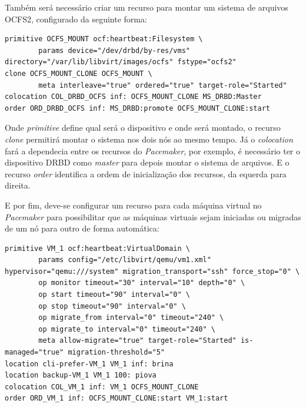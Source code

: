 Também será necessário criar um recurso para montar um sistema de arquivos \ac{OCFS2}, configurado da seguinte forma:
\begin{lstlisting}
primitive OCFS_MOUNT ocf:heartbeat:Filesystem \
        params device="/dev/drbd/by-res/vms" directory="/var/lib/libvirt/images/ocfs" fstype="ocfs2"
clone OCFS_MOUNT_CLONE OCFS_MOUNT \
        meta interleave="true" ordered="true" target-role="Started"
colocation COL_DRBD_OCFS inf: OCFS_MOUNT_CLONE MS_DRBD:Master
order ORD_DRBD_OCFS inf: MS_DRBD:promote OCFS_MOUNT_CLONE:start
\end{lstlisting}
Onde \textit{primitive} define qual será o dispositivo e onde será montado, o recurso \textit{clone} permitirá montar o sistema nos dois nós
ao mesmo tempo. Já o \textit{colocation} fará a dependecia entre os recursos do \textit{Pacemaker}, por exemplo, é necessário ter o dispositivo 
\ac{DRBD} como \textit{master} para depois montar o sistema de arquivos. E o recurso \textit{order} identifica a ordem de inicialização dos 
recursos, da equerda para direita.

E por fim, deve-se configurar um recurso para cada máquina virtual no \textit{Pacemaker} para possibilitar que as máquinas virtuais sejam 
iniciadas ou migradas de um nó para outro de forma automática: 
\begin{lstlisting}
primitive VM_1 ocf:heartbeat:VirtualDomain \
        params config="/etc/libvirt/qemu/vm1.xml" hypervisor="qemu:///system" migration_transport="ssh" force_stop="0" \
        op monitor timeout="30" interval="10" depth="0" \
        op start timeout="90" interval="0" \
        op stop timeout="90" interval="0" \
        op migrate_from interval="0" timeout="240" \
        op migrate_to interval="0" timeout="240" \
        meta allow-migrate="true" target-role="Started" is-managed="true" migration-threshold="5"
location cli-prefer-VM_1 VM_1 inf: brina
location backup-VM_1 VM_1 100: piova
colocation COL_VM_1 inf: VM_1 OCFS_MOUNT_CLONE
order ORD_VM_1 inf: OCFS_MOUNT_CLONE:start VM_1:start
\end{lstlisting}

